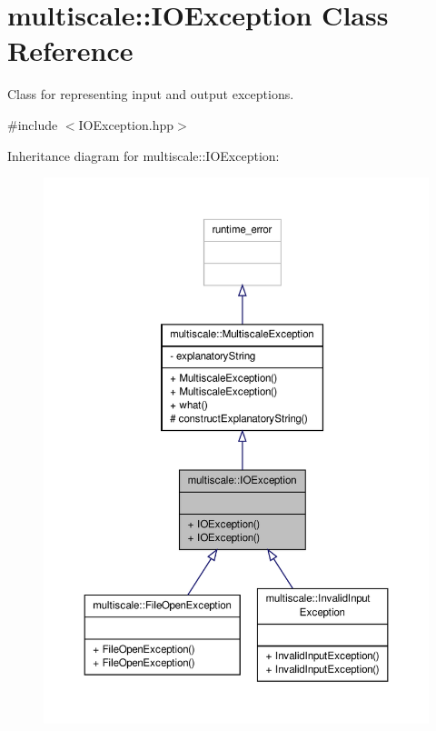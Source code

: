 \hypertarget{classmultiscale_1_1IOException}{\section{multiscale\-:\-:I\-O\-Exception Class Reference}
\label{classmultiscale_1_1IOException}
}


Class for representing input and output exceptions.  




{\ttfamily \#include $<$I\-O\-Exception.\-hpp$>$}



Inheritance diagram for multiscale\-:\-:I\-O\-Exception\-:
\nopagebreak
\begin{figure}[H]
\begin{center}
\leavevmode
\includegraphics[width=350pt]{classmultiscale_1_1IOException__inherit__graph}
\end{center}
\end{figure}


